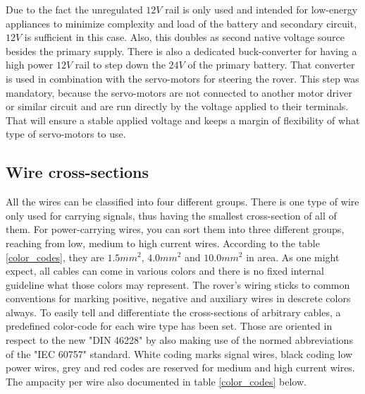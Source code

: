     Due to the fact the unregulated $12V$ rail is only used and intended for low-energy appliances to minimize complexity and load of the battery and secondary circuit, $12V$ is sufficient in this case. Also, this doubles as second native voltage source besides the primary supply. There is also a dedicated buck-converter for having a high power $12V$ rail to step down the $24V$ of the primary battery. That converter is used in combination with the servo-motors for steering the rover. This step was mandatory, because the servo-motors are not connected to another motor driver or similar circuit and are run directly by the voltage applied to their terminals. That will ensure a stable applied voltage and keeps a margin of flexibility of what type of servo-motors to use. 

    \clearpage %

    \subsection{Wire cross-sections}

    All the wires can be classified into four different groups. There is one type of wire only used for carrying signals, thus having the smallest cross-section of all of them. For power-carrying wires, you can sort them into three different groups, reaching from low, medium to high current wires. According to the table \ref{color_codes}, they are $1.5mm^2$, $4.0mm^2$ and $10.0mm^2$ in area. As one might expect, all cables can come in various colors and there is no fixed internal guideline what those colors may represent. The rover's wiring sticks to common conventions for marking positive, negative and auxiliary wires in descrete colors always. To easily tell and differentiate the cross-sections of arbitrary cables, a predefined color-code for each wire type has been set. Those are oriented in respect to the new "DIN 46228" by also making use of the normed abbreviations of the "IEC 60757" standard. White coding marks signal wires, black coding low power wires, grey and red codes are reserved for medium and high current wires. The ampacity per wire also documented in table \ref{color_codes} below.
    
    
